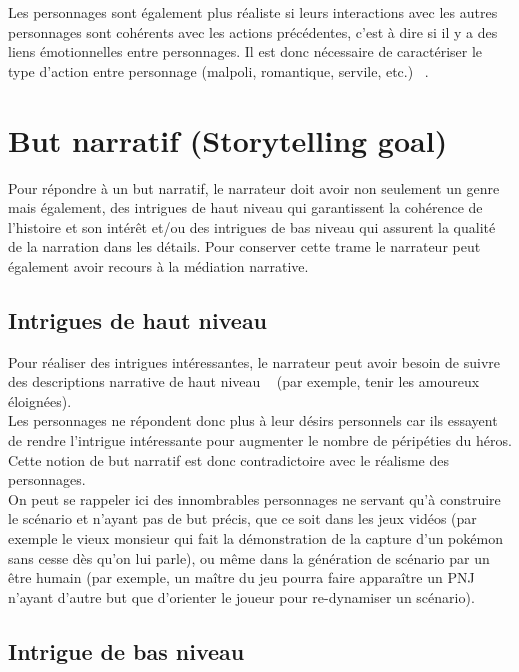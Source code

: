 \documentclass[asi]{picINSA}
\begin{document}
Les personnages sont également plus réaliste si leurs interactions avec les autres personnages sont cohérents avec les actions précédentes, c'est à dire si il y a des liens émotionnelles entre personnages. Il est donc nécessaire de caractériser le type d'action entre personnage (malpoli, romantique, servile, etc.) ~\cite{IRIS:conf/aamas/CavazzaCM2002}. \\

\section{But narratif (Storytelling goal)}

Pour répondre à un but narratif, le narrateur doit avoir non seulement un genre mais également, des intrigues de haut niveau
qui garantissent la cohérence de l'histoire et son intérêt et/ou des intrigues de bas niveau qui assurent la qualité de la narration dans les détails. Pour conserver cette trame le narrateur peut également avoir recours à la médiation narrative.

\subsection{Intrigues de haut niveau}

Pour réaliser des intrigues intéressantes, le narrateur peut avoir besoin de suivre des descriptions narrative de haut niveau
~\cite{Ciarlini:2010:ERP:1658866.1658874} (par exemple, tenir les amoureux éloignées). \\
Les personnages ne répondent donc plus à leur désirs personnels car ils essayent de rendre l'intrigue intéressante
pour augmenter le nombre de péripéties du héros. Cette notion de but narratif est donc contradictoire avec le réalisme
des personnages. \\

On peut se rappeler ici des innombrables personnages ne servant qu'à construire le scénario et n'ayant pas de but précis,
que ce soit dans les jeux vidéos (par exemple le vieux monsieur qui fait la démonstration de la capture d'un pokémon sans cesse
dès qu'on lui parle), ou même dans la génération de scénario par un être humain (par exemple, un maître du jeu pourra faire
 apparaître un PNJ n'ayant d'autre but que d'orienter le joueur pour re-dynamiser un scénario). \\

\subsection{Intrigue de bas niveau}
\end{document}
